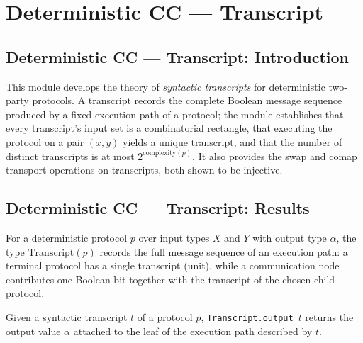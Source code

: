 \section{Deterministic CC --- Transcript}
\subsection*{Deterministic CC --- Transcript: Introduction}

This module develops the theory of \emph{syntactic transcripts} for deterministic
two-party protocols.  A transcript records the complete Boolean message sequence
produced by a fixed execution path of a protocol; the module establishes that every
transcript's input set is a combinatorial rectangle, that executing the protocol on a
pair $(x,y)$ yields a unique transcript, and that the number of distinct transcripts is
at most $2^{\mathrm{complexity}(p)}$.  It also provides the swap and comap transport
operations on transcripts, both shown to be injective.

\subsection*{Deterministic CC --- Transcript: Results}

\begin{definition}
\label{CommunicationComplexity.Deterministic.Protocol.Transcript}
\leanok
{}
For a deterministic protocol $p$ over input types $X$ and $Y$ with output type $\alpha$,
the type $\mathrm{Transcript}(p)$ records the full message sequence of an execution path:
a terminal protocol has a single transcript (unit), while a communication node
contributes one Boolean bit together with the transcript of the chosen child protocol.
\end{definition}

\begin{definition}
\label{CommunicationComplexity.Deterministic.Protocol.Transcript.output}
\leanok
{}
Given a syntactic transcript $t$ of a protocol $p$, \texttt{Transcript.output}~$t$ returns
the output value $\alpha$ attached to the leaf of the execution path described by $t$.
\end{definition}

